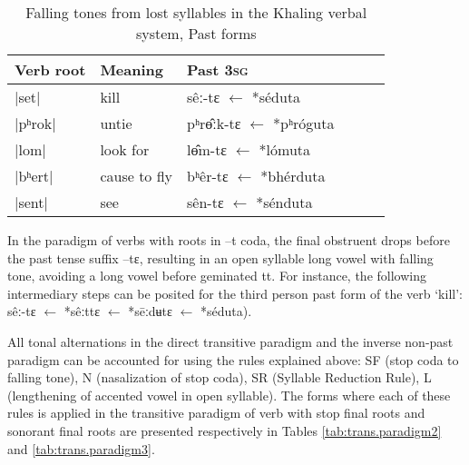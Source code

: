 \documentclass[oldfontcommands,oneside,a4paper,11pt]{article}
\newcommand{\ipa}[1]{{\phon \mbox{#1}}} %
\begin{document}
 
\begin{table}[H] 
\caption{Falling tones from lost syllables in the Khaling verbal system, Past forms} \centering  \label{tab:falling.verb3} 
\begin{tabular}{llllll} 
\toprule 
Verb root	&Meaning	& Past \textsc{3sg} \\ 
\midrule 
|set|	&	kill			&\ipa{sêː-tɛ} $\leftarrow$ \ipa{*séduta}  \\ 
|pʰrok|	&	untie		&\ipa{pʰrɵ̂ːk-tɛ} $\leftarrow$ \ipa{*pʰróguta} \\
|lom|	&	look for		&\ipa{lɵ̂m-tɛ} $\leftarrow$ \ipa{*lómuta}  \\ 
\midrule
|bʰert|	&	cause to fly			&\ipa{bʰêr-tɛ} $\leftarrow$ \ipa{*bhérduta} \\ 
|sent|	&	see			&\ipa{sên-tɛ} $\leftarrow$ \ipa{*sénduta}  \\ 
\bottomrule 
\end{tabular} 
\end{table} 

In the paradigm of verbs with roots in \ipa{--t} coda, the final obstruent drops before the past tense suffix \ipa{--tɛ}, resulting in an open syllable long vowel with falling tone, avoiding a long vowel before geminated \ipa{tt}. For instance, the following intermediary steps can be posited for the third person past form of the verb `kill': \ipa{sêː-tɛ}   $\leftarrow$ \ipa{*sêːttɛ}  $\leftarrow$ \ipa{*sēːdʉtɛ}  $\leftarrow$ \ipa{*séduta}).



All tonal alternations in the direct transitive paradigm and the inverse non-past paradigm can be accounted for using the rules explained above: SF (stop coda to falling tone), N (nasalization of stop coda), SR (Syllable Reduction Rule), L (lengthening of accented vowel in open syllable). The forms where each of these rules is applied in the transitive paradigm of verb with stop final roots and sonorant final roots are presented respectively in Tables \ref{tab:trans.paradigm2} and \ref{tab:trans.paradigm3}.
\end{document}
